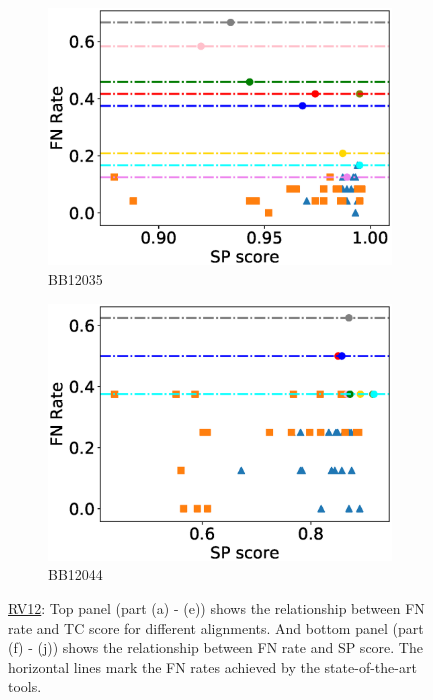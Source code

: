 \begin{figure}[!htbp]
\begin{adjustwidth}{-1cm}{-1cm}
\begin{subfigure}{0.22\textwidth}
			\includegraphics[width=\columnwidth]{Figure/summary/precomputedInit/Balibase/BB12035_fnrate_vs_sp_2}
			\caption{BB12035}
		\end{subfigure}	
		\begin{subfigure}{0.22\textwidth}
			\includegraphics[width=\columnwidth]{Figure/summary/precomputedInit/Balibase/BB12044_fnrate_vs_sp_2}
			\caption{BB12044}
		\end{subfigure}
		\caption{\underline{RV12}: Top panel (part (a) - (e)) shows the relationship between FN rate and TC score for different alignments. And bottom panel (part (f) - (j)) shows the relationship between FN rate and SP score. The horizontal lines mark the FN rates achieved by the state-of-the-art tools.}
		\label{fig:rv12_fnrate_vs_tc}
	\end{adjustwidth}
\end{figure}
